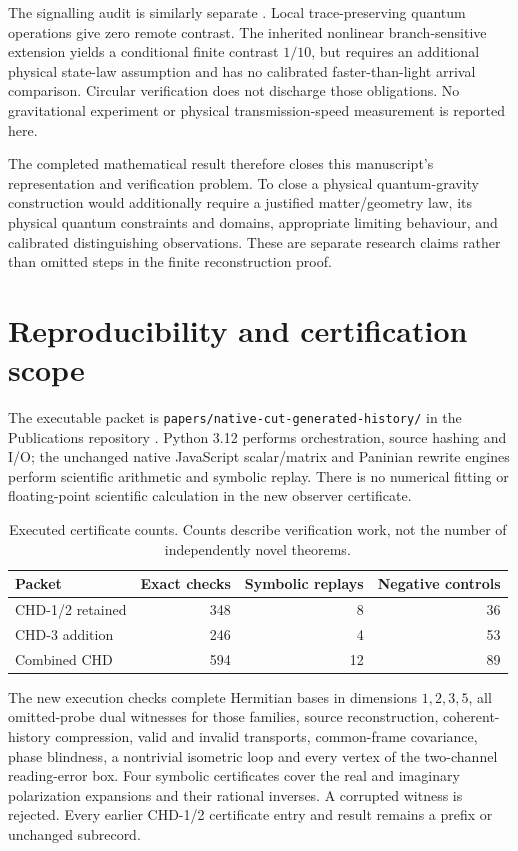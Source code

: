 \documentclass[11pt,a4paper]{article}
\begin{document}
The signalling audit is similarly separate \cite{gsa}. Local
trace-preserving quantum operations give zero remote contrast. The inherited
nonlinear branch-sensitive extension yields a conditional finite contrast
$1/10$, but requires an additional physical state-law assumption and has
no calibrated faster-than-light arrival comparison. Circular verification
does not discharge those obligations. No gravitational experiment or
physical transmission-speed measurement is reported here.

The completed mathematical result therefore closes this manuscript's
representation and verification problem. To close a physical quantum-gravity
construction would additionally require a justified matter/geometry law,
its physical quantum constraints and domains, appropriate limiting behaviour,
and calibrated distinguishing observations. These are separate research
claims rather than omitted steps in the finite reconstruction proof.

\section{Reproducibility and certification scope}

The executable packet is \texttt{papers/native-cut-generated-history/} in
the Publications repository \cite{chd}. Python 3.12 performs orchestration,
source hashing and I/O; the unchanged native JavaScript scalar/matrix and
Paninian rewrite engines perform scientific arithmetic and symbolic replay.
There is no numerical fitting or floating-point scientific calculation in
the new observer certificate.

\begin{table}[ht]
\centering
\caption{Executed certificate counts. Counts describe verification work,
not the number of independently novel theorems.}
\begin{tabular}{lrrr}
\toprule
Packet & Exact checks & Symbolic replays & Negative controls\\
\midrule
CHD-1/2 retained & 348 & 8 & 36\\
CHD-3 addition & 246 & 4 & 53\\
Combined CHD & 594 & 12 & 89\\
\bottomrule
\end{tabular}
\end{table}

The new execution checks complete Hermitian bases in dimensions $1,2,3,5$,
all omitted-probe dual witnesses for those families, source reconstruction,
coherent-history compression, valid and invalid transports, common-frame
covariance, phase blindness, a nontrivial isometric loop and every vertex of
the two-channel reading-error box. Four symbolic certificates cover the
real and imaginary polarization expansions and their rational inverses.
A corrupted witness is rejected. Every earlier CHD-1/2 certificate entry
and result remains a prefix or unchanged subrecord.
\end{document}
